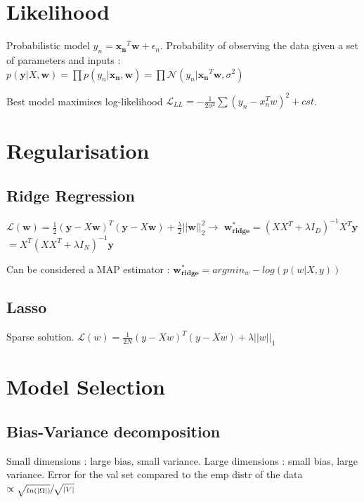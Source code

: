 \section{Likelihood}
Probabilistic model $y_n = \mathbf{x_n}^T\mathbf{w} + \epsilon_n$.
Probability of observing the data given a set of parameters and inputs :
$p(\mathbf{y}|X, \mathbf{w}) = \prod p(y_n|\mathbf{x_n}, \mathbf{w})  = \prod \mathcal{N} (y_n | \mathbf{x_n}^T\mathbf{w}, \sigma^2)$

Best model maximises log-likelihood $\mathcal{L}_{LL} = -\frac{1}{2\sigma^2} \sum(y_n-x_n^Tw)^2+cst$.


\section{Regularisation}
\subsection{Ridge Regression}
$\mathcal{L}(\mathbf{w}) = \frac{1}{2} (\mathbf{y} - X\mathbf{w})^T(\mathbf{y} - X\mathbf{w}) + \frac{\lambda}{2} ||\mathbf{w}||^2_2 \rightarrow$
$\mathbf{w^*_{ridge}} = (XX^T + \lambda I_D)^{-1}X^T\mathbf{y}$\newline $= X^T(XX^T + \lambda I_N)^{-1}\mathbf{y}$

Can be considered a MAP estimator : $\mathbf{w^*_{ridge}} = arg min_w - log(p(w|X,y))$

\subsection{Lasso}
Sparse solution.
$\mathcal{L}(w) = \frac{1}{2N} (y - Xw)^T(y - Xw) + \lambda ||w||_1 $

\section{Model Selection}
\subsection{Bias-Variance decomposition}
Small dimensions : large bias, small variance.
Large dimensions : small bias, large variance.
Error for the val set compared to the emp distr of the data $\propto \sfrac{\sqrt{ln(|\Omega|)}}{\sqrt{|V|}}$


